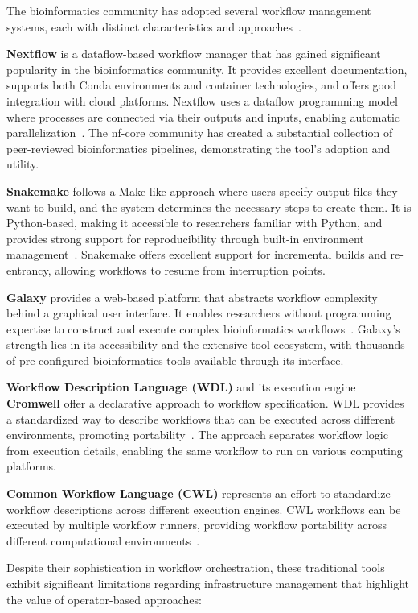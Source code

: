 The bioinformatics community has adopted several workflow management systems, each with distinct characteristics and approaches~\cite{workflows_review_nature}.

\textbf{Nextflow} is a dataflow-based workflow manager that has gained significant popularity in the bioinformatics community.
It provides excellent documentation, supports both Conda environments and container technologies, and offers good integration with cloud platforms.
Nextflow uses a dataflow programming model where processes are connected via their outputs and inputs, enabling automatic parallelization~\cite{nextflow}.
The nf-core community has created a substantial collection of peer-reviewed bioinformatics pipelines, demonstrating the tool's adoption and utility.

\textbf{Snakemake} follows a Make-like approach where users specify output files they want to build, and the system determines the necessary steps to create them.
It is Python-based, making it accessible to researchers familiar with Python, and provides strong support for reproducibility through built-in environment management~\cite{snakemake}.
Snakemake offers excellent support for incremental builds and re-entrancy, allowing workflows to resume from interruption points.

\textbf{Galaxy} provides a web-based platform that abstracts workflow complexity behind a graphical user interface.
It enables researchers without programming expertise to construct and execute complex bioinformatics workflows~\cite{galaxy}.
Galaxy's strength lies in its accessibility and the extensive tool ecosystem, with thousands of pre-configured bioinformatics tools available through its interface.

\textbf{Workflow Description Language (WDL)} and its execution engine \textbf{Cromwell} offer a declarative approach to workflow specification.
WDL provides a standardized way to describe workflows that can be executed across different environments, promoting portability~\cite{wdl_cromwell}.
The approach separates workflow logic from execution details, enabling the same workflow to run on various computing platforms.

\textbf{Common Workflow Language (CWL)} represents an effort to standardize workflow descriptions across different execution engines.
CWL workflows can be executed by multiple workflow runners, providing workflow portability across different computational environments~\cite{cwl}.

Despite their sophistication in workflow orchestration, these traditional tools exhibit significant limitations regarding infrastructure management that highlight the value of operator-based approaches:

